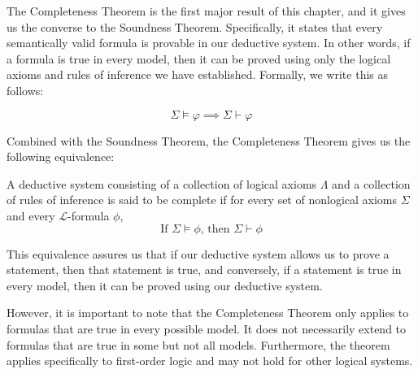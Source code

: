 \documentclass[10pt,a4paper]{article}
\newcounter{theo}
\newcommand{\curveL}{\mathcal{L}}
\begin{document}
                        The Completeness Theorem is the first major result of this chapter, and it gives us the converse to the Soundness Theorem. Specifically, it states that every semantically valid formula is provable in our deductive system. In other words, if a formula is true in every model, then it can be proved using only the logical axioms and rules of inference we have established. Formally, we write this as follows:

                        \begin{equation} 
                            \Sigma \models \varphi \implies \Sigma \vdash \varphi
                        \end{equation}
                        
                        Combined with the Soundness Theorem, the Completeness Theorem gives us the following equivalence:
                        
                        \begin{define}
                            A deductive system consisting of a collection of logical axioms $\Lambda$ and a collection of rules of inference is said to be complete if for every set of nonlogical axioms $\Sigma$ and every $\curveL$-formula $\phi$,
                            \begin{equation}
                                \text{If } \Sigma\vDash\phi \text{, then } \Sigma\vdash\phi
                            \end{equation}
                        \end{define}

                        This equivalence assures us that if our deductive system allows us to prove a statement, then that statement is true, and conversely, if a statement is true in every model, then it can be proved using our deductive system.
                        
                        However, it is important to note that the Completeness Theorem only applies to formulas that are true in every possible model. It does not necessarily extend to formulas that are true in some but not all models. Furthermore, the theorem applies specifically to first-order logic and may not hold for other logical systems.
                        

                        





                        

                


                    \newpage
                    
                    
            
\end{document}
